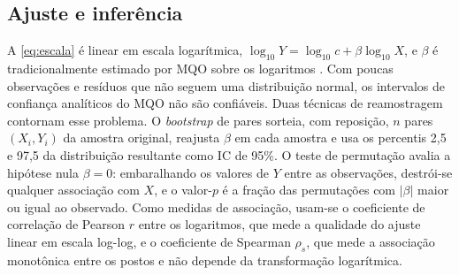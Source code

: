 \subsection{Ajuste e inferência}

A \autoref{eq:escala} é linear em escala logarítmica, $\log_{10} Y = \log_{10} c + \beta \log_{10} X$, e $\beta$ é tradicionalmente estimado por \gls{MQO} sobre os logaritmos \cite{bettencourt2007}. Com poucas observações e resíduos que não seguem uma distribuição normal, os intervalos de confiança analíticos do MQO não são confiáveis. Duas técnicas de reamostragem contornam esse problema. O \textit{bootstrap} de pares \cite{efron1979} sorteia, com reposição, $n$ pares $(X_i, Y_i)$ da amostra original, reajusta $\beta$ em cada amostra e usa os percentis 2,5 e 97,5 da distribuição resultante como \gls{IC} de 95\%. O teste de permutação \cite{good2005} avalia a hipótese nula $\beta = 0$: embaralhando os valores de $Y$ entre as observações, destrói-se qualquer associação com $X$, e o valor-$p$ é a fração das permutações com $|\beta|$ maior ou igual ao observado. Como medidas de associação, usam-se o coeficiente de correlação de Pearson $r$ entre os logaritmos, que mede a qualidade do ajuste linear em escala log-log, e o coeficiente de Spearman $\rho_s$, que mede a associação monotônica entre os postos e não depende da transformação logarítmica.
